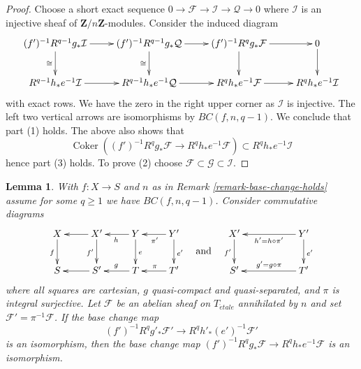 \documentclass{amsart}
\theoremstyle{plain}
\newtheorem{lemma}[subsection]{Lemma}
\theoremstyle{definition}
\theoremstyle{remark}
\numberwithin{equation}{subsection}
\def\etale{{\acute{e}tale}}
\def\Coker{\mathop{\mathrm{Coker}}}
\begin{document}
\begin{proof}
Choose a short exact sequence
$0 \to \mathcal{F} \to \mathcal{I} \to \mathcal{Q} \to 0$
where $\mathcal{I}$ is an injective sheaf of $\mathbf{Z}/n\mathbf{Z}$-modules.
Consider the induced diagram
$$
\xymatrix{
(f')^{-1}R^{q - 1}g_*\mathcal{I} \ar[d]_{\cong} \ar[r] &
(f')^{-1}R^{q - 1}g_*\mathcal{Q} \ar[d]_{\cong} \ar[r] &
(f')^{-1}R^qg_*\mathcal{F} \ar[d] \ar[r] &
0 \ar[d] \\
R^{q - 1}h_*e^{-1}\mathcal{I} \ar[r] &
R^{q - 1}h_*e^{-1}\mathcal{Q} \ar[r] &
R^qh_*e^{-1}\mathcal{F} \ar[r] &
R^qh_*e^{-1}\mathcal{I}
}
$$
with exact rows. We have the zero in the right upper corner
as $\mathcal{I}$ is injective. The left two vertical arrows are
isomorphisms by $BC(f, n, q - 1)$. We conclude that part (1) holds.
The above also shows that
$$
\Coker\left(
(f')^{-1}R^qg_*\mathcal{F}\to R^qh_*e^{-1}\mathcal{F}
\right)
\subset
R^qh_*e^{-1}\mathcal{I}
$$
hence part (3) holds. To prove (2) choose
$\mathcal{F} \subset \mathcal{G} \subset \mathcal{I}$.
\end{proof}


\begin{lemma}
\label{lemma-base-change-q-integral-top}
With $f : X \to S$ and $n$ as in Remark \ref{remark-base-change-holds}
assume for some $q \geq 1$ we have $BC(f, n, q - 1)$. Consider
commutative diagrams
$$
\vcenter{
\xymatrix{
X \ar[d]_f &
X' \ar[d]_{f'} \ar[l] &
Y \ar[l]^h \ar[d]^e &
Y' \ar[l]^{\pi'} \ar[d]^{e'} \\
S &
S' \ar[l] &
T \ar[l]_g &
T' \ar[l]_\pi
}
}
\quad\text{and}\quad
\vcenter{
\xymatrix{
X' \ar[d]_{f'} & & Y' \ar[ll]^{h' = h \circ \pi'} \ar[d]^{e'} \\
S' & & T' \ar[ll]_{g' = g \circ \pi}
}
}
$$
where all squares are cartesian, $g$ quasi-compact and quasi-separated, and
$\pi$ is integral surjective. Let $\mathcal{F}$ be an abelian sheaf
on $T_\etale$ annihilated by $n$ and set $\mathcal{F}' = \pi^{-1}\mathcal{F}$.
If the base change map
$$
(f')^{-1}R^qg'_*\mathcal{F}' \longrightarrow R^qh'_*(e')^{-1}\mathcal{F}'
$$
is an isomorphism, then the base change map
$(f')^{-1}R^qg_*\mathcal{F} \to R^qh_*e^{-1}\mathcal{F}$
is an isomorphism.
\end{lemma}
\end{document}
